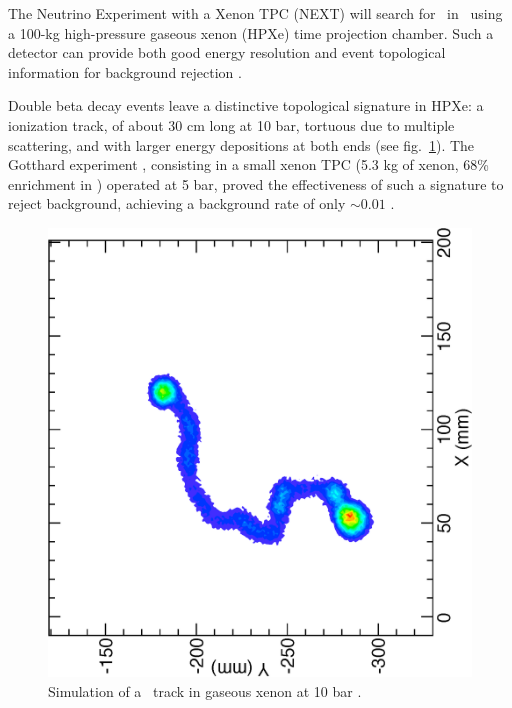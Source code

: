 The Neutrino Experiment with a Xenon TPC (NEXT) \cite{NEXT:2011eyk} will search for \bbonu\ in \XE\ using a 100-kg high-pressure gaseous xenon (HPXe) time projection chamber. 
Such a detector can provide both good energy resolution and event topological information for background rejection \cite{Nygren:2009zz}.

Double beta decay events leave a distinctive topological signature in HPXe: a ionization track, of about 30 cm long at 10 bar, tortuous due to multiple scattering, and with larger energy depositions at both ends (see fig.~\ref{fig:next_track}). The Gotthard experiment \cite{Luscher:1998sd}, consisting in a small xenon TPC (5.3 kg of xenon, 68\% enrichment in \XE ) operated at 5 bar, proved the effectiveness of such a signature to reject background, achieving a background rate of only $\sim0.01$ \ckky.

\begin{figure}[t!]
\vspace{0.75cm}
\begin{center}
\includegraphics[angle=-90,scale=0.45]{img/bb0nu_track_10atm.eps}
\end{center}
\caption{Simulation of a \bbonu\ track in gaseous xenon at 10 bar \cite{NEXT:2011eyk}.} \label{fig:next_track}
\end{figure}

